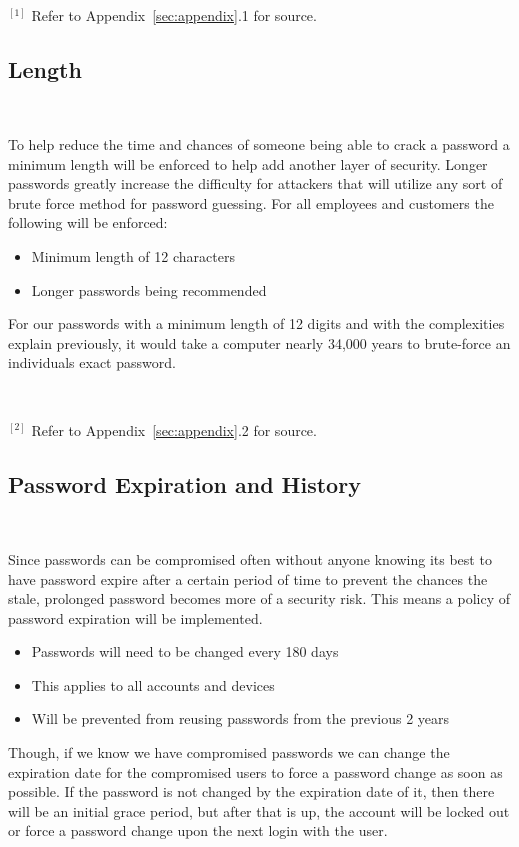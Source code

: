 \documentclass[12pt,a4paper]{report}
\begin{document}
\

\noindent
$^{[1]}$ Refer to Appendix~\ref{sec:appendix}.1 for source.

\subsection{Length}
\

To help reduce the time and chances of someone being able to crack a password a minimum length will be enforced to help add another layer of security. 
Longer passwords greatly increase the difficulty for attackers that will utilize any sort of brute force method for password guessing. 
For all employees and customers the following will be enforced:
\begin{itemize}
 \item Minimum length of 12 characters
 \item Longer passwords being recommended
\end{itemize}

For our passwords with a minimum length of 12 digits and with the complexities explain previously, it would take a computer nearly 34,000 years to brute-force an individuals exact password.

\

\noindent
$^{[2]}$ Refer to Appendix~\ref{sec:appendix}.2 for source.

\subsection{Password Expiration and History}
\

Since passwords can be compromised often without anyone knowing its best to have password expire after a certain period of time to prevent the chances the stale, prolonged password becomes more of a security risk.
This means a policy of password expiration will be implemented.
\begin{itemize}
 \item Passwords will need to be changed every 180 days
 \item This applies to all accounts and devices
 \item Will be prevented from reusing passwords from the previous 2 years
\end{itemize}

Though, if we know we have compromised passwords we can change the expiration date for the compromised users to force a password change as soon as possible.
If the password is not changed by the expiration date of it, then there will be an initial grace period, but after that is up, the account will be locked out or force a password change upon the next login with the user.
\end{document}
